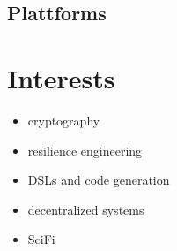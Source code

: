 \documentclass{gnet_cv}
\begin{document}
\subsection{Plattforms}

\section{Interests}
\begin{minipage}[t]{0.45\textwidth}
\begin{itemize}
    \setlength\itemsep{0pt}
    \item cryptography
    \item resilience engineering
    \item DSLs and code generation
\end{itemize}
\end{minipage}
\begin{minipage}[t]{0.45\textwidth}
\begin{itemize}
    \setlength\itemsep{0pt}
    \item decentralized systems
    \item SciFi
\end{itemize}
\end{minipage}
\end{document}
